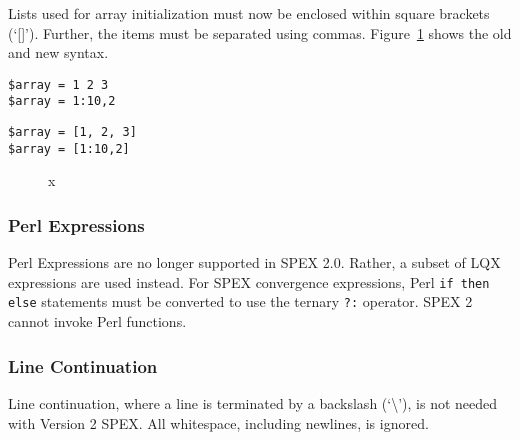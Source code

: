 Lists used for array initialization must now be enclosed within square brackets
(`[]')\index{[]}.  Further, the items must be separated using
commas. Figure~\ref{fig:spex-array-initialization} shows the old and new syntax.
\newsavebox{\spexone}
\newsavebox{\spextwo}
\begin{lrbox}{\spexone}
\begin{minipage}{.3\textwidth}
\begin{lstlisting}
$array = 1 2 3
$array = 1:10,2
\end{lstlisting}
\end{minipage}
\end{lrbox}
\begin{lrbox}{\spextwo}
\begin{minipage}{.3\textwidth}
\begin{lstlisting}
$array = [1, 2, 3]
$array = [1:10,2]
\end{lstlisting}
\end{minipage}
\end{lrbox}
\begin{figure}
  \centering
  \subfloat[Spex 1]{\usebox{\spexone}}
  \subfloat[Spex 2]{\usebox{\spextwo}}
  \caption{x}
  \label{fig:spex-array-initialization}
\end{figure}

\subsubsection{Perl Expressions}

Perl Expressions are no longer supported in SPEX 2.0.  Rather, a subset of
LQX expressions are used instead.  For SPEX convergence
expressions, Perl \texttt{if then else} statements must be
converted to use the ternary \texttt{?:}
operator.  SPEX 2 cannot invoke Perl functions.

\subsubsection{Line Continuation}

Line continuation, where a line is terminated by a backslash (`\textbackslash')\index{\textbackslash}, is not needed
with Version 2 SPEX.  All whitespace, including newlines, is ignored.

